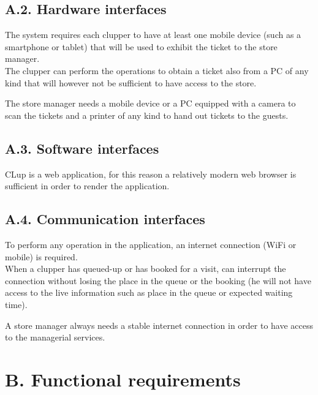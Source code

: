\subsection{A.2. Hardware interfaces}

The system requires each clupper to have at least one mobile device (such as a smartphone or tablet) that will be used to exhibit the ticket to the store manager.\\
The clupper can perform the operations to obtain a ticket also from a PC of any kind that will however not be sufficient to have access to the store.

The store manager needs a mobile device or a PC equipped with a camera to scan the tickets and a printer of any kind to hand out tickets to the guests.

\subsection{A.3. Software interfaces}

CLup is a web application, for this reason a relatively modern web browser is sufficient in order to render the application.

\subsection{A.4. Communication interfaces}

To perform any operation in the application, an internet connection (WiFi or mobile) is required.\\
When a clupper has queued-up or has booked for a visit, can interrupt the connection without losing the place in the queue or the booking (he will not have access to the live information such as place in the queue or expected waiting time).

A store manager always needs a stable internet connection in order to have access to the managerial services.

\section{B. Functional requirements}

